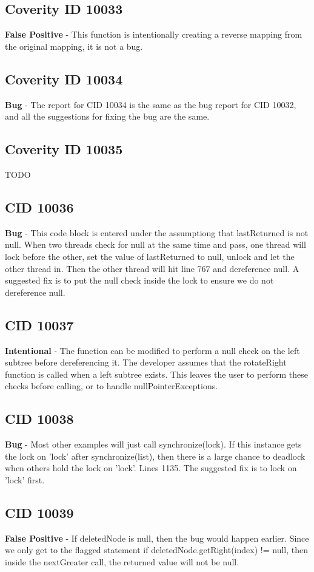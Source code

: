 \documentclass[12pt]{article}
\begin{document}
\subsection*{Coverity ID 10033}
\textbf{False Positive} - This function is intentionally creating a reverse mapping from the original mapping, it is not a bug.
\subsection{Coverity ID 10034}
\textbf{Bug} - The report for CID 10034 is the same as the bug report for CID 10032, and all the suggestions for fixing the bug are the same.
\subsection*{Coverity ID 10035}
TODO
\subsection{CID 10036}
\textbf{Bug} - This code block is entered under the assumptiong that lastReturned is not null. When two threads check for null at the same time and pass, one thread will lock before the other, set the value of lastReturned to null, unlock and let the other thread in. Then the other thread will hit line 767 and dereference null. A suggested fix is to put the null check inside the lock to ensure we do not dereference null.
\subsection{CID 10037}
\textbf{Intentional} - The function can be modified to perform a null check on the left subtree before dereferencing it. The developer assumes that the rotateRight function is called when a left subtree exists. This leaves the user to perform these checks before calling, or to handle nullPointerExceptions.
\subsection{CID 10038}
\textbf{Bug} - Most other examples will just call synchronize(lock). If this instance gets the lock on 'lock' after synchronize(list), then there is a large chance to deadlock when others hold the lock on 'lock'. Lines 1135. The suggested fix is to lock on 'lock' first.
\subsection{CID 10039}
\textbf{False Positive} - If deletedNode is null, then the bug would happen earlier. Since we only get to the flagged statement if deletedNode.getRight(index) != null, then inside the nextGreater call, the returned value will not be null.
\end{document}
